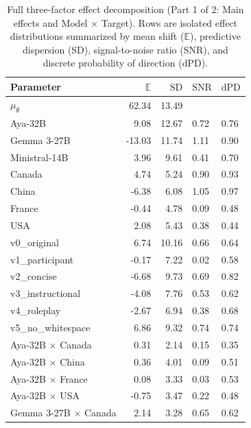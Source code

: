 \begin{table}[htbp]
  \caption{Full three-factor effect decomposition (Part 1 of 2: Main effects and Model $\times$ Target). Rows are isolated effect distributions summarized by mean shift ($\mathbb{E}$), predictive dispersion (SD), signal-to-noise ratio (SNR), and discrete probability of direction (dPD).}
  \label{tab:prompt-effects}
  \centering
  \begin{small}
  \begin{sc}
  \begin{tabular}{lrrll}
  \toprule
  Parameter & $\mathbb{E}$ & $\mathrm{SD}$ & $\mathrm{SNR}$ & $\mathrm{dPD}$ \\
  \midrule
  $\mu_{\emptyset}$ & 62.34 & 13.49 &  &  \\
  \midrule
  Aya-32B        &   9.08 & 12.67 & 0.72 & 0.76 \\
  Gemma 3-27B    & -13.03 & 11.74 & 1.11 & 0.90 \\
  Ministral-14B  &   3.96 &  9.61 & 0.41 & 0.70 \\
  \midrule
  Canada &   4.74 & 5.24 & 0.90 & 0.93 \\
  China  &  -6.38 & 6.08 & 1.05 & 0.97 \\
  France &  -0.44 & 4.78 & 0.09 & 0.48 \\
  USA    &   2.08 & 5.43 & 0.38 & 0.44 \\
  \midrule
  v0\_original       &   6.74 & 10.16 & 0.66 & 0.64 \\
  v1\_participant    &  -0.17 &  7.22 & 0.02 & 0.58 \\
  v2\_concise        &  -6.68 &  9.73 & 0.69 & 0.82 \\
  v3\_instructional  &  -4.08 &  7.76 & 0.53 & 0.62 \\
  v4\_roleplay       &  -2.67 &  6.94 & 0.38 & 0.68 \\
  v5\_no\_whitespace &   6.86 &  9.32 & 0.74 & 0.74 \\
  \midrule
  Aya-32B $\times$ Canada       &  0.31 & 2.14 & 0.15 & 0.35 \\
  Aya-32B $\times$ China        &  0.36 & 4.01 & 0.09 & 0.51 \\
  Aya-32B $\times$ France       &  0.08 & 3.33 & 0.03 & 0.53 \\
  Aya-32B $\times$ USA          & -0.75 & 3.47 & 0.22 & 0.48 \\
  \midrule
  Gemma 3-27B $\times$ Canada   &  2.14 & 3.28 & 0.65 & 0.62 \\

\end{tabular}
\end{sc}
\end{small}
\end{table}
